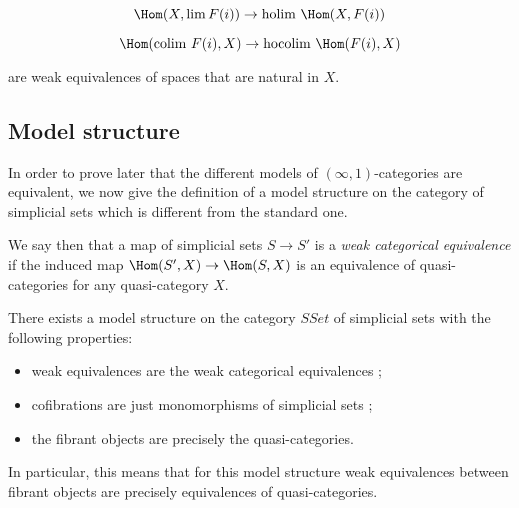 $$\Hom(X, \lim F(i)) \to \text{holim }\Hom(X,F(i))  $$

$$ \Hom(\text{colim }F(i),X) \to \text{hocolim } \Hom(F(i),X) $$

are weak equivalences of spaces that are natural in $X$.


\subsection{Model structure}

In order to prove later that the different models of $(\infty,1)$-categories are equivalent, we now give the definition of a model structure on the category of simplicial sets which is different from the standard one.

We say then that a map of simplicial sets $S \to S'$ is a \emph{weak categorical equivalence} if the induced map $\Hom(S',X) \to \Hom(S,X)$ is an equivalence of quasi-categories for any quasi-category $X$.

\begin{thm}[Joyal] There exists a model structure on the category $SSet$ of simplicial sets with the following properties:
\begin{itemize}
\item weak equivalences are the weak categorical equivalences ;
\item cofibrations are just monomorphisms of simplicial sets ;
\item the fibrant objects are precisely the quasi-categories.
\end{itemize}
\end{thm}



In particular, this means that for this model structure weak equivalences between fibrant objects are precisely equivalences of quasi-categories.

